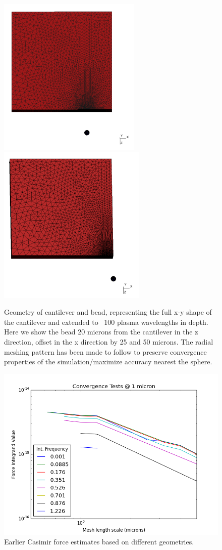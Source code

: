\documentclass[11pt,traditabstract]{article}
\begin{document}
\begin{figure}[!h]
\centering
\includegraphics[height=3in]{L-20_W-25}
\includegraphics[height=3in]{L-20_W-50}
\caption{Geometry of cantilever and bead, representing the full x-y shape of the cantilever and extended to ~100 plasma wavelengths in depth. Here we show the bead 20 microns from the cantilever in the z direction, offset in the x direction by 25 and 50 microns. The radial meshing pattern has been made to follow to preserve convergence properties of the simulation/maximize accuracy nearest the sphere.}\label{fig:geoLat}
\end{figure}

\begin{figure}[h]
\centering
\includegraphics[width=5.5in]{convergence}
\caption{Earlier Casimir force estimates based on different geometries.}\label{fig:conv1}
\end{figure}
\end{document}
